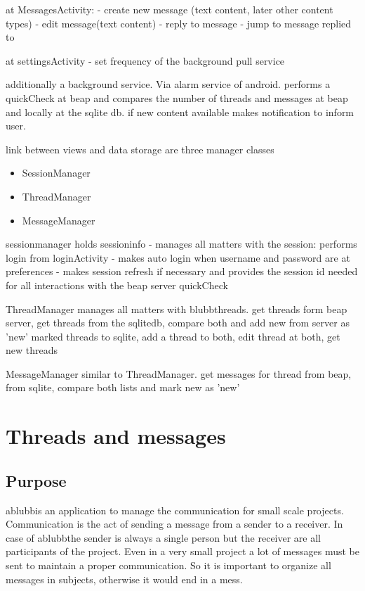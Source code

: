 \documentclass[12pt,a4paper,oneside]{report}
\newcommand{\appname}{ablubb}
\begin{document}
at MessagesActivity:
- create new message (text content, later other content types)
- edit message(text content)
- reply to message
- jump to message replied to

at settingsActivity
- set frequency of the background pull service

additionally a background service. Via alarm service of android.
performs a quickCheck at beap and compares the number of threads and messages at beap and locally at the sqlite db. if new content available makes notification to inform user.

link between views and data storage are three manager classes
\begin{itemize}
\item{SessionManager}
\item{ThreadManager}
\item{MessageManager}
\end{itemize}

sessionmanager holds sessioninfo - manages all matters with the session: performs login from loginActivity - makes auto login when username and password are at preferences - makes session refresh if necessary and provides the session id needed for all interactions with the beap server quickCheck 

ThreadManager manages all matters with blubbthreads. get threads form beap server, get threads from the sqlitedb, compare both and add new from server as 'new' marked threads to sqlite, add a thread to both, edit thread at both, get new threads

MessageManager similar to ThreadManager. get messages for thread from beap, from sqlite, compare both lists and mark new as 'new' 

\section{Threads and messages}
\subsection{Purpose}
\appname  is an application to manage the communication for small scale projects. Communication is the act of sending a message from a sender to a receiver. In case of \appname  the sender is always a single person but the receiver are all participants of the project. Even in a very small project a lot of messages must be sent to maintain a proper communication. So it is important to organize all messages in subjects, otherwise it would end in a mess.
\end{document}
